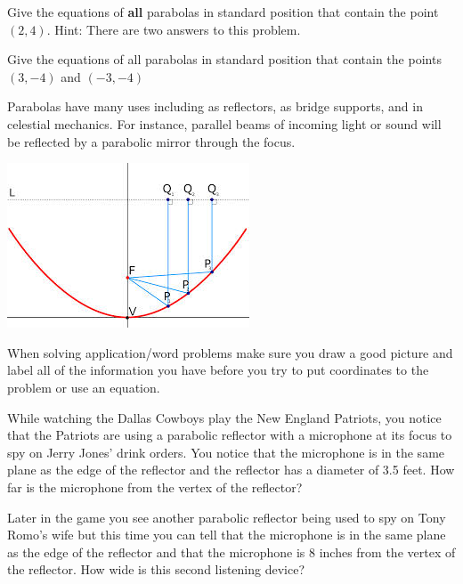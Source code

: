 \question Give the equations of \textbf{all} parabolas in standard position that contain the point $(2,4)$. Hint: There are two answers to this problem.

\question Give the equations of all parabolas in standard position that contain the points $(3,-4)$ and $(-3,-4)$

\begin{info} Parabolas have many uses including as reflectors, as bridge supports, and in celestial mechanics. For instance, parallel beams of incoming light or sound will be reflected by a parabolic mirror through the focus.

\begin{center} \includegraphics{parabolicreflector.jpg} \end{center}

When solving application/word problems make sure you draw a good picture and label all of the information you have before you try to put coordinates to the problem or use an equation.
\end{info}

\question While watching the Dallas Cowboys play the New England Patriots, you notice that the Patriots are using a parabolic reflector with a microphone at its focus to spy on Jerry Jones' drink orders. You notice that the microphone is in the same plane as the edge of the reflector and the reflector has a diameter of 3.5 feet. How far is the microphone from the vertex of the reflector?

\question Later in the game you see another parabolic reflector being used to spy on Tony Romo's wife but this time you can tell that the microphone is in the same plane as the edge of the reflector and that the microphone is 8 inches from the vertex of the reflector. How wide is this second listening device?


